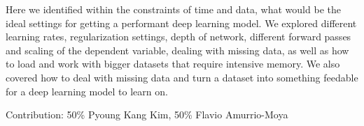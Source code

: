 \documentclass[10pt,twocolumn,letterpaper]{article}
\begin{document}
Here we identified within the constraints of time and data, what would be the
ideal settings for getting a performant deep learning model. We explored
different learning rates, regularization settings, depth of network, different
forward passes and scaling of the dependent variable, dealing with missing data,
as well as how to load and work with bigger datasets that require intensive
memory. We also covered how to deal with missing data and turn a dataset into
something feedable for a deep learning model to learn on.


Contribution: 50\% Pyoung Kang Kim, 50\% Flavio Amurrio-Moya


















\end{document}
